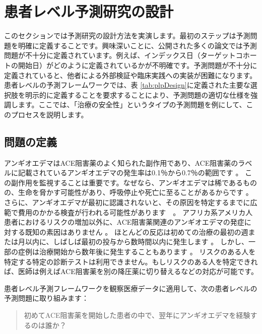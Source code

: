 \documentclass[
  11pt]{book}
\theoremstyle{definition}
\theoremstyle{definition}
\theoremstyle{definition}
\theoremstyle{definition}
\theoremstyle{remark}
\begin{document}
\section{患者レベル予測研究の設計}\label{ux60a3ux8005ux30ecux30d9ux30ebux4e88ux6e2cux7814ux7a76ux306eux8a2dux8a08}

このセクションでは予測研究の設計方法を実演します。最初のステップは予測問題を明確に定義することです。興味深いことに、公開された多くの論文では予測問題が不十分に定義されています。例えば、インデックス日（ターゲットコホートの開始日）がどのように定義されているかが不明確です。予測問題が不十分に定義されていると、他者による外部検証や臨床実践への実装が困難になります。患者レベルの予測フレームワークでは、表 \ref{tab:plpDesign}に定義された主要な選択肢を明示的に定義することを要求することにより、予測問題の適切な仕様を強調します。ここでは、「治療の安全性」というタイプの予測問題を例にして、このプロセスを説明します。 

\subsection{問題の定義}\label{ux554fux984cux306eux5b9aux7fa9-2}

アンギオエデマはACE阻害薬のよく知られた副作用であり、ACE阻害薬のラベルに記載されているアンギオエデマの発生率は0.1％から0.7％の範囲です \citep{byrd_2006}。 この副作用を監視することは重要です。なぜなら、アンギオエデマは稀であるものの、生命を脅かす可能性があり、呼吸停止や死亡に至ることがあるからです \citep{norman_2013}。 さらに、アンギオエデマが最初に認識されないと、その原因を特定するまでに広範で費用のかかる検査が行われる可能性があります　\citep{norman_2013, thompson_1993}。 アフリカ系アメリカ人患者におけるリスクの増加以外に、ACE阻害薬関連のアンギオエデマの発症に対する既知の素因はありません \citep{byrd_2006}。 ほとんどの反応は初めての治療の最初の週または月以内に、しばしば最初の投与から数時間以内に発生します \citep{circardi_2004}。 しかし、一部の症例は治療開始から数年後に発生することもあります \citep{mara_1996}。 リスクのある人を特定する特定の診断テストは利用できません。もしリスクのある人を特定できれば、医師は例えばACE阻害薬を別の降圧薬に切り替えるなどの対応が可能です。  

患者レベル予測フレームワークを観察医療データに適用して、次の患者レベルの予測問題に取り組みます：

\begin{quote}
初めてACE阻害薬を開始した患者の中で、翌年にアンギオエデマを経験するのは誰か？
\end{quote}
\end{document}
